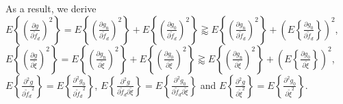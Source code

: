 \documentclass[12pt, draftclsnofoot, onecolumn]{IEEEtran}
\begin{document}
As a result, we derive $E\left\{ {{\left( \frac{\partial g}{\partial {{{\tilde{f}}}_{d}}} \right)}^{2}} \right\} =E\left\{ {{\left( \frac{\partial {{g}_{\mathrm{n}}}}{\partial {{{\tilde{f}}}_{d}}} \right)}^{2}} \right\}+E\left\{ {{\left( \frac{\partial {{g}_{0}}}{\partial {{{\tilde{f}}}_{d}}} \right)}^{2}} \right\} \gtrapprox E\left\{ {{\left( \frac{\partial {{g}_{\mathrm{n}}}}{\partial {{{\tilde{f}}}_{d}}} \right)}^{2}} \right\}+\left( E\left\{ {{\frac{\partial {{g}_{0}}}{\partial {{{\tilde{f}}}_{d}}} }} \right\}\right)^{2}$, $E\left\{ {{\left( \frac{\partial g}{\partial \tilde{\xi }} \right)}^{2}} \right\} =E\left\{ {{\left( \frac{\partial {{g}_{\mathrm{n}}}}{\partial \tilde{\xi }} \right)}^{2}} \right\}+E\left\{ {{\left( \frac{\partial {{g}_{0}}}{\partial \tilde{\xi }} \right)}^{2}} \right\} \gtrapprox E\left\{ {{\left( \frac{\partial {{g}_{\mathrm{n}}}}{\partial {{{\tilde{\xi}}}}} \right)}^{2}} \right\}+\left( E\left\{ {{\frac{\partial {{g}_{0}}}{\partial {{{\tilde{\xi}}}}} }} \right\}\right)^{2}$, $E\left\{ \frac{{{\partial }^{2}}g}{\partial {{{\tilde{f}}}_{d}}^{2}} \right\} =E\left\{ \frac{{{\partial }^{2}}{{g}_{0}}}{\partial {{{\tilde{f}}}_{d}}^{2}} \right\}$, $E\left\{ \frac{{{\partial }^{2}}g}{\partial {{{\tilde{f}}}_{d}}\partial \tilde{\xi }} \right\} =E\left\{ \frac{{{\partial }^{2}}{{g}_{0}}}{\partial {{{\tilde{f}}}_{d}}\partial \tilde{\xi }} \right\}$ and $E\left\{ \frac{{{\partial }^{2}}g}{\partial {{{\tilde{\xi }}}^{2}}} \right\} =E\left\{ \frac{{{\partial }^{2}}{{g}_{0}}}{\partial {{{\tilde{\xi }}}^{2}}} \right\}$.
\end{document}
